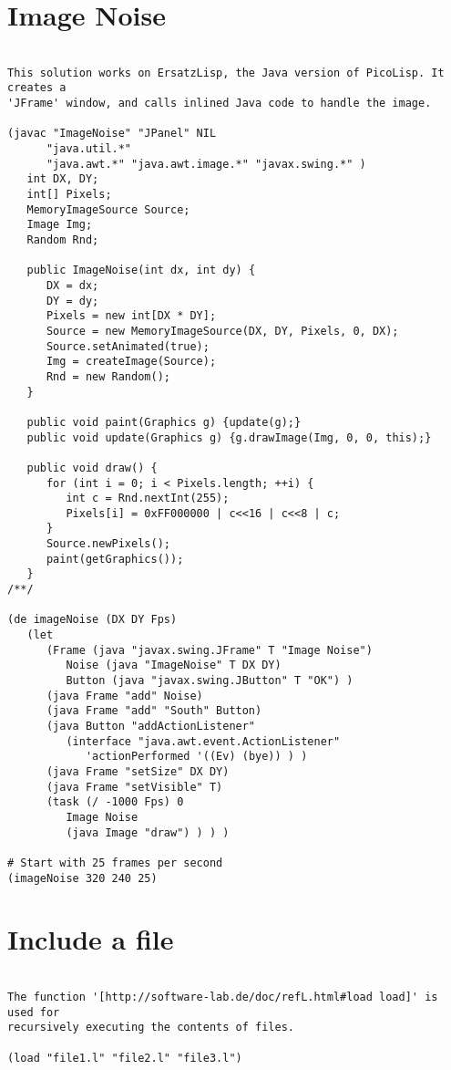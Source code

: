 \section*{Image Noise}

\begin{verbatim}

This solution works on ErsatzLisp, the Java version of PicoLisp. It creates a
'JFrame' window, and calls inlined Java code to handle the image.

(javac "ImageNoise" "JPanel" NIL
      "java.util.*"
      "java.awt.*" "java.awt.image.*" "javax.swing.*" )
   int DX, DY;
   int[] Pixels;
   MemoryImageSource Source;
   Image Img;
   Random Rnd;

   public ImageNoise(int dx, int dy) {
      DX = dx;
      DY = dy;
      Pixels = new int[DX * DY];
      Source = new MemoryImageSource(DX, DY, Pixels, 0, DX);
      Source.setAnimated(true);
      Img = createImage(Source);
      Rnd = new Random();
   }

   public void paint(Graphics g) {update(g);}
   public void update(Graphics g) {g.drawImage(Img, 0, 0, this);}

   public void draw() {
      for (int i = 0; i < Pixels.length; ++i) {
         int c = Rnd.nextInt(255);
         Pixels[i] = 0xFF000000 | c<<16 | c<<8 | c;
      }
      Source.newPixels();
      paint(getGraphics());
   }
/**/

(de imageNoise (DX DY Fps)
   (let
      (Frame (java "javax.swing.JFrame" T "Image Noise")
         Noise (java "ImageNoise" T DX DY)
         Button (java "javax.swing.JButton" T "OK") )
      (java Frame "add" Noise)
      (java Frame "add" "South" Button)
      (java Button "addActionListener"
         (interface "java.awt.event.ActionListener"
            'actionPerformed '((Ev) (bye)) ) )
      (java Frame "setSize" DX DY)
      (java Frame "setVisible" T)
      (task (/ -1000 Fps) 0
         Image Noise
         (java Image "draw") ) ) )

# Start with 25 frames per second
(imageNoise 320 240 25)

\end{verbatim}

\section*{Include a file}

\begin{verbatim}

The function '[http://software-lab.de/doc/refL.html#load load]' is used for
recursively executing the contents of files.

(load "file1.l" "file2.l" "file3.l")

\end{verbatim}

